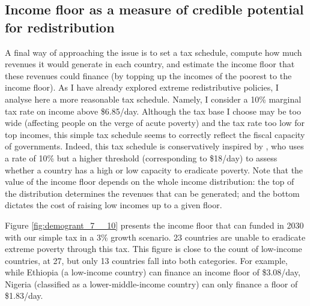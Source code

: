 
\subsection{Income floor as a measure of credible potential for redistribution}

A final way of approaching the issue is to set a tax schedule, compute how much revenues it would generate in each country, and estimate the income floor that these revenues could finance (by topping up the incomes of the poorest to the income floor). As I have already explored extreme redistributive policies, I analyse here a more reasonable tax schedule. Namely, I consider a 10\% marginal tax rate on income above \$6.85/day. Although the tax base I choose may be too wide (affecting people on the verge of acute poverty) %
and the tax rate too low for top incomes, 
this simple tax schedule seems to correctly reflect the fiscal capacity of governments. Indeed, this tax schedule is conservatively inspired by \cite{ravallion_poorer_2010}, who uses a rate of 10\% but a higher threshold (corresponding to \$18/day) to assess whether a country has a high or low capacity to eradicate poverty. Note that the value of the income floor depends on the whole income distribution: the top of the distribution determines the revenues that can be generated; and the bottom dictates the cost of raising low incomes up to a given floor. 

Figure \ref{fig:demogrant_7__10} presents the income floor that can funded in 2030 with our simple tax in a 3\% growth scenario. 23 countries are unable to eradicate extreme poverty through this tax. This figure is close to the count of low-income countries, at 27, but only 13 countries fall into both categories.
For example, while Ethiopia (a low-income country) can finance an income floor of \$3.08/day, Nigeria (classified as a lower-middle-income country) can only finance a floor of \$1.83/day. 

